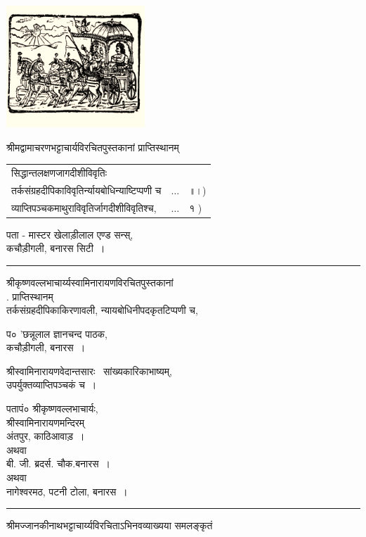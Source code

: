 \documentclass[10pt, openany]{book}
\begin{document}
{\begin{minipage}{.7\textwidth}
    \includegraphics[scale=1.25]{graphics/Capture3.PNG}
\end{minipage}
\vspace*{\fill}
\newpage
\hfill
\newpage
\begin{mdframed}
\begin{center}
\large
श्रीमद्वामाचरणभट्टाचार्यविरचितपुस्तकानां प्राप्तिस्थानम्
\end{center}
\vspace{5mm}
\begin{tabular}{lll}
    सिद्धान्तलक्षणजागदीशीविवृतिः&&\\
तर्कसंग्रहदीपिकाविवृतिर्न्यायबोधिन्याष्टिप्पणी च &$\ldots$ &॥।)\\
व्याप्तिपञ्चकमाथुराविवृतिर्जागदीशीविवृतिश्च, &$\ldots$& १  )
\end{tabular}
\begin{flushright}
\large
पता - मास्टर खेलाड़ीलाल एण्ड सन्स्, \\
 कचौड़ीगली, बनारस सिटी~।~
\end{flushright}
 \hrule
\begin{center}
{\large श्रीकृष्णवल्लभाचार्य्यस्वामिनारायणविरचितपुस्तकानां     \\
. प्राप्तिस्थानम्  }\\
तर्कसंग्रहदीपिकाकिरणावली, न्यायबोधिनीपदकृतटिप्पणी च,
\end{center}
\begin{flushright}
\large
 प० 'छन्नूलाल ज्ञानचन्द पाठक,\\
कचौड़ीगली, बनारस~।
\end{flushright}
\begin{center}
श्रीस्वामिनारायणवेदान्तसारः \textemdash\  सांख्यकारिकाभाष्यम्,\\
उपर्युक्तव्याप्तिपञ्चकं च~।   
\end{center}
\begin{flushright}
{\large
  पता\textendash पं० श्रीकृष्णवल्लभाचार्यः, \\
 श्रीस्वामिनारायणमन्दिरम्} \\
अंतपुर, काठिआवाड़~।\\
अथवा \textemdash\;\;\;\;\;\;\;\;\;\;\;\;\;\;\\
{\large बी. जी. ब्रदर्स. चौक.बनारस~।}\\
अथवा\textemdash\;\;\;\;\;\;\;\;\;\;\;\;\;\;\;\\
{\large  नागेश्वरमठ, पटनी टोला, बनारस~।} 
\end{flushright}
\hrule
\begin{center}
श्रीमज्जानकीनाथभट्टाचार्य्यविरचिताऽभिनवव्याख्यया समलङ्कृतं    
\end{center}


\end{mdframed}}
\end{document}
